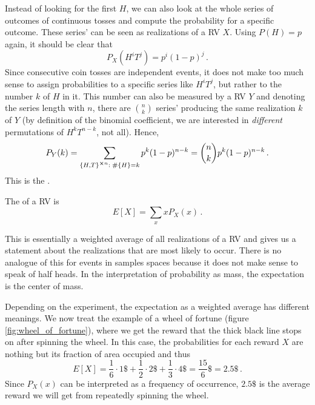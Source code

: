 \begin{ex}
Instead of looking for the first $H$, we can also look at the whole series of outcomes of continuous tosses and compute the probability for a specific outcome. These series' can be seen as realizations of a RV $X$. Using $P(H) = p$ again, it should be clear that
\begin{equation*}
P_X(H^i T^j) = p^i (1 - p)^j \, .
\end{equation*}
Since consecutive coin tosses are independent events, it does not make too much sense to assign probabilities to a specific series like $H^i T^j$, but rather to the number $k$ of $H$ in it. This number can also be measured by a RV $Y$ and denoting the series length with $n$, there are $\binom{n}{k}$ series' producing the same realization $k$ of $Y$ (by definition of the binomial coefficient, we are interested in \emph{different} permutations of $H^k T^{n - k}$, not all). Hence,
\begin{equation*}
P_Y(k) = \sum_{\qty{H, T}^{\cross n}: \; \#\qty{H} = k} p^k (1 - p)^{n - k} = \binom{n}{k} p^k (1 - p)^{n - k} \, .
\end{equation*}
This is the .
\end{ex}


\begin{defi}[Expectation]
The  of a RV is
\begin{equation}
E[X] = \sum_x x P_X(x) \, .
\end{equation}
\end{defi}
This is essentially a weighted average of all realizations of a RV and gives us a statement about the realizations that are most likely to occur. There is no analogue of this for events in samples spaces because it does not make sense to speak of half heads. In the interpretation of probability as mass, the expectation is the center of mass.


\begin{ex}
Depending on the experiment, the expectation as a weighted average has different meanings. We now treat the example of a wheel of fortune (figure \ref{fig:wheel_of_fortune}), where we get the reward that the thick black line stops on after spinning the wheel. In this case, the probabilities for each reward $X$ are nothing but its fraction of area occupied and thus
\begin{equation*}
E[X] = \frac{1}{6} \cdot 1\$ + \frac{1}{2} \cdot 2\$ + \frac{1}{3} \cdot 4\$ = \frac{15}{6} \$ = 2.5\$ \, .
\end{equation*}
Since $P_X(x)$ can be interpreted as a frequency of occurrence, $2.5\$$ is the average reward we will get from repeatedly spinning the wheel.
\end{ex}



